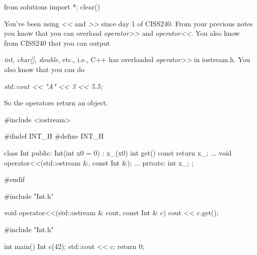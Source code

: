\begin{python0}
from solutions import *; clear()
\end{python0}

You've been using \textit{<<} and
\textit{>>} since day 1 of CISS240. From your
previous notes you know that you can overload
\textit{operator>>} and
\textit{operator<<}. You also know from CISS240 that you
can output

\textit{int, char[], double}, etc., i.e., C++ has overloaded
\textit{operator>>} in iostream.h. You also know
that you can do

\textit{std::cout << "A" << 3 << 5.5;}

So the operators return an object.

\begin{consolethree}[escapeinside=||]
#include <iostream>

#ifndef INT_H
#define INT_H

class Int
{
public:
    Int(int x0 = 0) : x_(x0) {}
    int get() const { return x_; }
    ...
    void operator<<(std::ostream &, const Int &);
    ...
private:
    int x_;
};

#endif
\end{consolethree}

\begin{consolethree}[escapeinside=||]
#include "Int.h"

void operator<<(std::ostream & cout, const Int & c)
{
    cout << c.get();
}
\end{consolethree}

\begin{consolethree}[escapeinside=||]
#include "Int.h"

int main()
{
    Int c(42);
    std::cout << c;
    return 0;
}
\end{consolethree}


